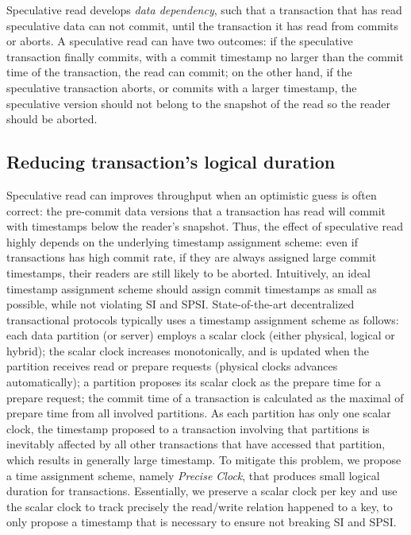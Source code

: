 Speculative read develops \textit{data dependency}, such that a transaction that has read speculative data can not commit, until the transaction it has read from commits or aborts. A speculative read can have two outcomes: if the speculative transaction finally commits, with a commit timestamp no larger than the commit time of the transaction, the read can commit; on the other hand, if the speculative transaction aborts, or commits with a larger timestamp, the speculative version should not belong to the snapshot of the read so the reader should be aborted.
\fi


\subsection{Reducing transaction's logical duration}
\label{sub:pc}
Speculative read can improves throughput when an optimistic guess is often correct: the pre-commit data versions that a transaction has read will commit with timestamps below the reader's snapshot. Thus, the effect of speculative read highly depends on the underlying timestamp assignment scheme: even if transactions has high commit rate, if they are always assigned large commit timestamps, their readers are still likely to be aborted. Intuitively, an ideal timestamp assignment scheme should assign commit timestamps as small as possible, while not violating SI and SPSI. State-of-the-art decentralized transactional protocols \cite{clocksi, pileus, spanner} typically uses a timestamp assignment scheme as follows: each data partition (or server) employs a scalar clock (either physical, logical or hybrid); the scalar clock increases monotonically, and is updated when the partition receives read or prepare requests (physical clocks advances automatically); a partition proposes its scalar clock as the prepare time for a prepare request; the commit time of a transaction is calculated as the maximal of prepare time from all involved partitions. As each partition has only one scalar clock, the timestamp proposed to a transaction involving that partitions is inevitably affected by all other transactions that have accessed that partition, which results in generally large timestamp. To mitigate this problem, we propose a time assignment scheme, namely \textit{Precise Clock}, that produces small logical duration for transactions. Essentially, we preserve a scalar clock per key and use the scalar clock to track precisely the read/write relation happened to a key, to only propose a timestamp that is necessary to ensure not breaking SI and SPSI. 



